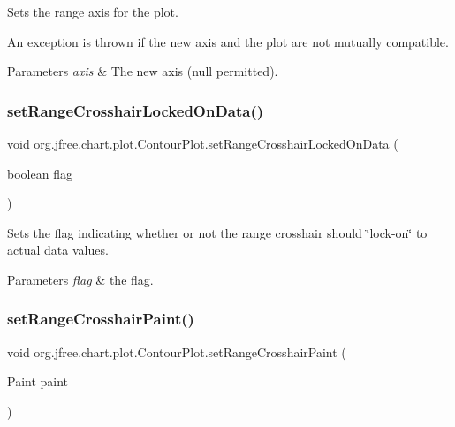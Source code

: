 Sets the range axis for the plot. 

An exception is thrown if the new axis and the plot are not mutually compatible.


\begin{DoxyParams}{Parameters}
{\em axis} & The new axis (null permitted). \\
\hline
\end{DoxyParams}
\mbox{\label{classorg_1_1jfree_1_1chart_1_1plot_1_1_contour_plot_a8da95d1e0ad83c2a6b739a65f194f3a5}} 
\subsubsection{\texorpdfstring{set\+Range\+Crosshair\+Locked\+On\+Data()}{setRangeCrosshairLockedOnData()}}
{\footnotesize\ttfamily void org.\+jfree.\+chart.\+plot.\+Contour\+Plot.\+set\+Range\+Crosshair\+Locked\+On\+Data (\begin{DoxyParamCaption}\item[{boolean}]{flag }\end{DoxyParamCaption})}

Sets the flag indicating whether or not the range crosshair should \char`\"{}lock-\/on\char`\"{} to actual data values.


\begin{DoxyParams}{Parameters}
{\em flag} & the flag. \\
\hline
\end{DoxyParams}
\mbox{\label{classorg_1_1jfree_1_1chart_1_1plot_1_1_contour_plot_a25b1d562f04f63d4cd9941943872d20a}} 
\subsubsection{\texorpdfstring{set\+Range\+Crosshair\+Paint()}{setRangeCrosshairPaint()}}
{\footnotesize\ttfamily void org.\+jfree.\+chart.\+plot.\+Contour\+Plot.\+set\+Range\+Crosshair\+Paint (\begin{DoxyParamCaption}\item[{Paint}]{paint }\end{DoxyParamCaption})}

